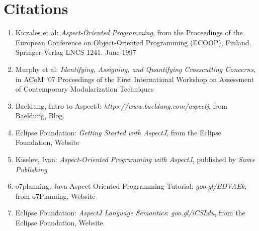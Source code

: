 \documentclass[sigconf]{acmart}
\begin{document}
\section{Citations}
\begin{enumerate}
    \item Kiczales et al: \textit{Aspect-Oriented Programming}, from the Proceedings of the European Conference on Object-Oriented Programming (ECOOP),
Finland. Springer-Verlag LNCS 1241. June 1997
    \item Murphy et al: \textit{Identifying, Assigning, and Quantifying Crosscutting Concerns}, in ACoM '07 Proceedings of the First International Workshop on Assessment of Contemporary Modularization Techniques
    \item Baeldung, Intro to AspectJ: \textit{https://www.baeldung.com/aspectj}, from Baeldung, Blog.
    \item Eclipse Foundation: \textit{Getting Started with AspectJ}, from the Eclipse Foundation, Website
    \item Kiselev, Ivan: \textit{Aspect-Oriented Programming with AspectJ}, published by \textit{Sams Publishing}
    \item o7planning, Java Aspect Oriented Programming Tutorial: \textit{goo.gl/BDVAEk}, from o7Planning, Website
    \item Eclipse Foundation: \textit{AspectJ Language Semantics}: \textit{goo.gl/iCSLdu}, from the Eclipse Foundation, Website.
\end{enumerate}
\end{document}
